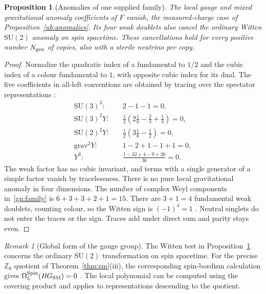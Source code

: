 \documentclass[aps,pra,onecolumn,superscriptaddress,nofootinbib,10pt]{revtex4-2}
\newtheorem{proposition}[theorem]{Proposition}
\theoremstyle{definition}
\theoremstyle{remark}
\newtheorem{remark}[theorem]{Remark}
\newcommand{\SU}{\mathrm{SU}}
\begin{document}
\begin{proposition}[Anomalies of one supplied family]\label{gn:anomaly}
The local gauge and mixed gravitational anomaly coefficients of $F$
vanish, the measured-charge case of Proposition~\ref{ub:anomalies}.
Its four weak doublets also cancel the ordinary Witten
$\SU(2)$ anomaly on spin spacetime. These cancellations hold
for every positive number $N_{\rm gen}$ of copies, also with a
sterile neutrino per copy.
\end{proposition}
\begin{proof}
Normalize the quadratic index of a fundamental to $1/2$ and the
cubic index of a colour fundamental to $1$, with opposite cubic
index for its dual. The five coefficients in all-left conventions
are obtained by tracing over the spectator representations
\cite[\S7.3]{gn:bilal}:
\[
\begin{aligned}
 \SU(3)^3:        &\quad 2-1-1=0,\\
 \SU(3)^2Y:       &\quad \tfrac12(2\tfrac16-\tfrac23+\tfrac13)=0,\\
 \SU(2)^2Y:       &\quad \tfrac12(3\tfrac16-\tfrac12)=0,\\
 \mathrm{grav}^2Y:        &\quad 1-2+1-1+1=0,\\
 Y^3:                    &\quad \tfrac{1-32+4-9+36}{36}=0 .
\end{aligned}
\]
The weak factor has no cubic invariant, and terms with a single
generator of a simple factor vanish by tracelessness. There is
no pure local gravitational anomaly in four dimensions.
The number of complex Weyl components in~\eqref{gn:family}
is $6+3+3+2+1=15$. There are $3+1=4$ fundamental weak
doublets, counting colour, so the Witten sign is $(-1)^4=1$
\cite{ub:witten}. Neutral singlets do not enter the traces or
the sign. Traces add under direct sum and parity stays even.
\end{proof}

\begin{remark}[Global form of the gauge group]\label{gn:global}
The Witten test in Proposition~\ref{gn:anomaly} concerns the ordinary
$\SU(2)$ transformation on spin spacetime. For the precise
$\mathbb Z_6$ quotient of Theorem~\ref{thm:sm}(iii), the corresponding
spin-bordism calculation gives
$\Omega^{\rm Spin}_5(BG_{\rm SM})=0$
\cite[\S4]{gn:dgl}. The local polynomial can be computed using the
covering product and applies to representations descending to the quotient.
\end{remark}
\end{document}
